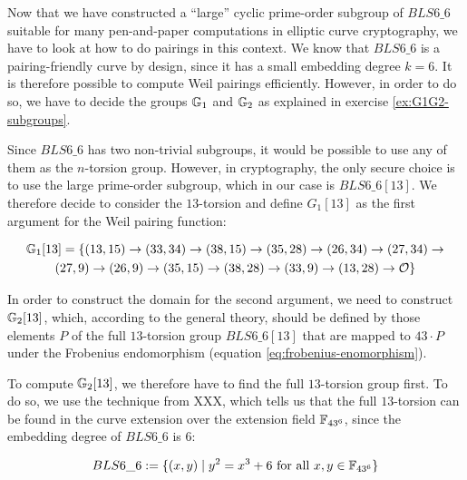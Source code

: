 \endgroup

Now that we have constructed a ``large'' cyclic prime-order subgroup of $BLS6\_6$ suitable for many pen-and-paper computations in elliptic curve cryptography, we have to look at how to do pairings in this context. We know that $BLS6\_6$ is a pairing-friendly curve by design, since it has a small embedding degree $k=6$. It is therefore possible to compute Weil pairings efficiently. However, in order to do so, we have to decide the groups $\mathbb{G}_1$ and $\mathbb{G}_2$ as explained in exercise \ref{ex:G1G2-subgroups}. 

Since $BLS6\_6$ has two non-trivial subgroups, it would be possible to use any of them as the $n$-torsion group. However, in cryptography, the only secure choice is to use the large prime-order subgroup, which in our case is $BLS6\_6[13]$. We therefore decide to consider the $13$-torsion and define ${G}_1[13]$ as the first argument for the Weil pairing function:

\begin{multline*}
\mathbb{G}_1[13]=\{(13,15) \rightarrow (33,34) \rightarrow  (38,15) \rightarrow  (35,28) \rightarrow (26,34) \rightarrow  (27,34) \rightarrow  \\ 
(27,9)  \rightarrow  (26,9) \rightarrow  (35,15) \rightarrow  (38,28) \rightarrow  (33,9) \rightarrow (13,28) \rightarrow  \mathcal{O}\}$$
\end{multline*}

In order to construct the domain for the second argument, we need to construct $\mathbb{G}_2[13]$, which, according to the general theory, should be defined by those elements $P$ of the full $13$-torsion group $BLS6\_6[13]$ that are mapped to $43\cdot P$ under the Frobenius endomorphism (equation \ref{eq:frobenius-enomorphism}). 

To compute $\mathbb{G}_2[13]$, we therefore have to find the full $13$-torsion group first. To do so, we use the technique from XXX, which tells us that the full $13$-torsion can be found in the curve extension over the extension field $\mathbb{F}_{43^6}$, since the embedding degree of $BLS6\_6$ is $6$:

\begin{equation}
BLS6\_6 := \{(x,y)\;|\; y^2 = x^3 + 6 \text{ for all } x,y \in \mathbb{F}_{43^6}\}
\end{equation}


